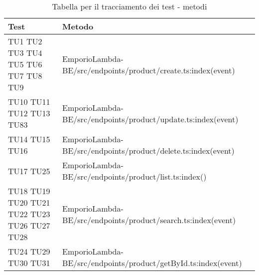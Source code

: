 {

\centering
\renewcommand{\arraystretch}{2}
\begin{longtable}{C{2cm} C{12.8cm}}
\caption{Tabella per il tracciamento dei test - metodi}\\
\textbf{Test} &
\textbf{Metodo}\\
\endhead


TU1 \newline TU2 \newline TU3 \newline TU4 \newline TU5 \newline TU6 \newline TU7 \newline TU8 \newline TU9 & EmporioLambda-BE/src/endpoints/product/create.ts:index(event)\\

TU10 \newline TU11 \newline TU12 \newline TU13 \newline TU83 & EmporioLambda-BE/src/endpoints/product/update.ts:index(event)\\

TU14 \newline TU15 \newline TU16 & EmporioLambda-BE/src/endpoints/product/delete.ts:index(event)\\

TU17 \newline TU25 & EmporioLambda-BE/src/endpoints/product/list.ts:index()\\

TU18 \newline TU19 \newline TU20 \newline TU21 \newline TU22 \newline TU23 \newline TU26 \newline TU27 \newline TU28 & EmporioLambda-BE/src/endpoints/product/search.ts:index(event)\\

TU24 \newline TU29 \newline TU30 \newline TU31 & EmporioLambda-BE/src/endpoints/product/getById.ts:index(event)\\


\end{longtable}}
